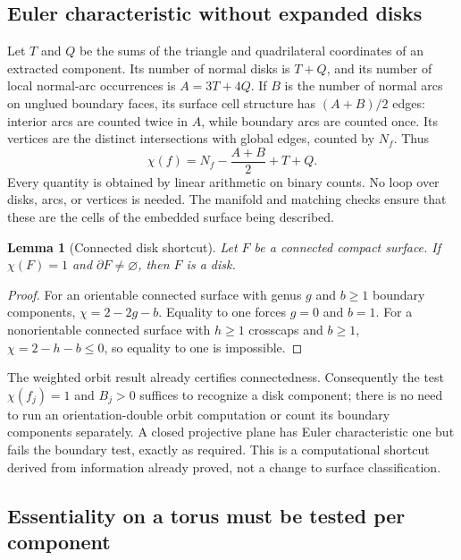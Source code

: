 \documentclass[11pt,a4paper]{article}
\newtheorem{lemma}[theorem]{Lemma}
\theoremstyle{definition}
\theoremstyle{remark}
\begin{document}
\subsection{Euler characteristic without expanded disks}

Let $T$ and $Q$ be the sums of the triangle and quadrilateral coordinates
of an extracted component. Its number of normal disks is $T+Q$, and its
number of local normal-arc occurrences is $A=3T+4Q$. If $B$ is the number
of normal arcs on unglued boundary faces, its surface cell structure has
$(A+B)/2$ edges: interior arcs are counted twice in $A$, while boundary
arcs are counted once. Its vertices are the distinct intersections with
global edges, counted by $N_f$. Thus
\begin{equation}\label{eq:euler}
             \chi(f)=N_f-\frac{A+B}{2}+T+Q.
\end{equation}
Every quantity is obtained by linear arithmetic on binary counts. No loop
over disks, arcs, or vertices is needed. The manifold and matching checks
ensure that these are the cells of the embedded surface being described.

\begin{lemma}[Connected disk shortcut]\label{lem:disk-shortcut}
Let $F$ be a connected compact surface. If $\chi(F)=1$ and
$\partial F\ne\varnothing$, then $F$ is a disk.
\end{lemma}
\begin{proof}
For an orientable connected surface with genus $g$ and $b\ge1$ boundary
components, $\chi=2-2g-b$. Equality to one forces $g=0$ and $b=1$.
For a nonorientable connected surface with $h\ge1$ crosscaps and
$b\ge1$, $\chi=2-h-b\le0$, so equality to one is impossible.
\end{proof}

The weighted orbit result already certifies connectedness. Consequently
the test $\chi(f_j)=1$ and $B_j>0$ suffices to recognize a disk component;
there is no need to run an orientation-double orbit computation or count
its boundary components separately. A closed projective plane has Euler
characteristic one but fails the boundary test, exactly as required.
This is a computational shortcut derived from information already proved,
not a change to surface classification.

\subsection{Essentiality on a torus must be tested per component}
\end{document}
